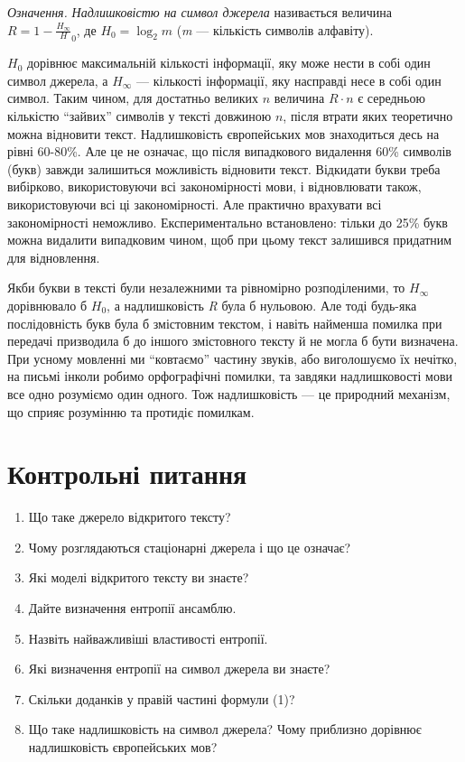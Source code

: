 \bigskip


\bigskip

\textit{Означення.} \textit{Надлишковістю на символ джерела} називається
величина  $R=1-\frac{H_{\infty }}H_0$, де 
$H_0=\log _2m$ (\textit{m} --- кількість символів алфавіту).

 $H_0$ дорівнює максимальній кількості інформації, яку може нести в собі
один символ джерела, а  $H_{\infty }$ --- кількості інформації, яку насправді
несе в собі один символ. Таким чином, для достатньо великих  $n$ величина 
$R\cdot n$ є середньою кількістю “зайвих” символів у тексті довжиною  $n$,
після втрати яких теоретично можна відновити текст. Надлишковість європейських
мов знаходиться десь на рівні 60-80\%. Але це не означає, що після випадкового
видалення 60\% символів (букв) завжди залишиться можливість відновити текст.
Відкидати букви треба вибірково, використовуючи всі закономірності мови, і
відновлювати також, використовуючи всі ці закономірності. Але практично
врахувати всі закономірності неможливо. Експериментально встановлено: тільки до
25\% букв можна видалити випадковим чином, щоб при цьому текст залишився
придатним для відновлення.

Якби букви в тексті були незалежними та рівномірно розподіленими, то 
$H_{\infty }$ дорівнювало б  $H_0$, а надлишковість  \textit{R} була
б нульовою. Але тоді будь-яка послідовність букв була б змістовним текстом, і
навіть найменша помилка при передачі  призводила б до іншого змістовного тексту
й не могла б бути визначена. При усному мовленні ми “ковтаємо” частину звуків,
або виголошуємо їх нечітко, на письмі інколи робимо орфографічні помилки, та
завдяки  надлишковості мови все одно розуміємо один одного. Тож надлишковість ---
це природний механізм, що сприяє розумінню та протидіє помилкам.


\bigskip


\bigskip

\section{Контрольні питання}


\bigskip


\bigskip

\liststyleWWviiiNumxii
\begin{enumerate}
\item Що таке джерело відкритого тексту?
\item Чому розглядаються стаціонарні джерела і що це означає?
\item Які моделі відкритого тексту ви знаєте?
\item Дайте визначення ентропії ансамблю.
\item Назвіть найважливіші властивості ентропії.
\item Які визначення ентропії на символ джерела ви знаєте?
\item Скільки доданків у правій частині формули (1)?
\item Що таке надлишковість на символ джерела? Чому приблизно дорівнює
надлишковість європейських мов?
\end{enumerate}

